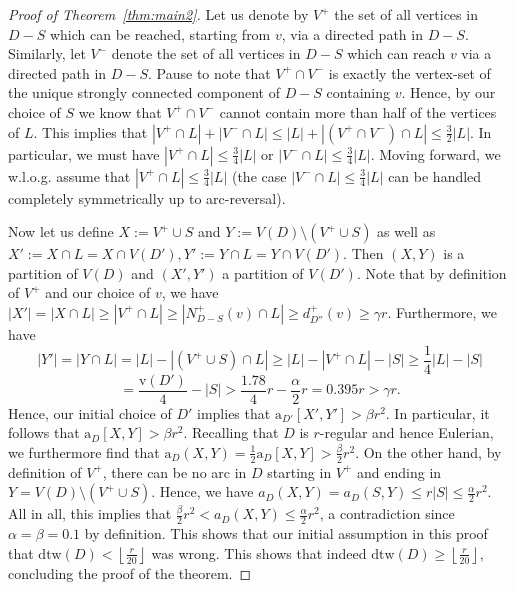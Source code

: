 \documentclass[a4paper,10pt]{article}
\begin{document}
\begin{proof}[Proof of Theorem~\ref{thm:main2}]
Let us denote by $V^+$ the set of all vertices in $D-S$ which can be reached, starting from $v$, via a directed path in $D-S$. Similarly, let $V^-$ denote the set of all vertices in $D-S$ which can reach $v$ via a directed path in $D-S$. Pause to note that $V^+\cap V^-$ is exactly the vertex-set of the unique strongly connected component of $D-S$ containing $v$. Hence, by our choice of $S$ we know that $V^+\cap V^-$ cannot contain more than half of the vertices of $L$. This implies that $|V^+\cap L|+|V^-\cap L|\le |L|+|(V^+\cap V^-)\cap L|\le \frac{3}{2}|L|$. In particular, we must have $|V^+\cap L|\le \frac{3}{4}|L|$ or $|V^-\cap L|\le \frac{3}{4}|L|$. Moving forward, we w.l.o.g. assume that $|V^+\cap L|\le \frac{3}{4}|L|$ (the case $|V^-\cap L|\le \frac{3}{4}|L|$ can be handled completely symmetrically up to arc-reversal).

Now let us define $X:=V^+\cup S$ and $Y:=V(D)\setminus (V^+\cup S)$ as well as $X':=X\cap L=X\cap V(D'), Y':=Y\cap L=Y\cap V(D')$. Then $(X,Y)$ is a partition of $V(D)$ and $(X',Y')$ a partition of $V(D')$. Note that by definition of $V^+$ and our choice of $v$, we have 
$|X'|=|X\cap L|\ge |V^+\cap L|\ge |N_{D-S}^+(v)\cap L|\ge d_{D''}^+(v)\ge \gamma r$. Furthermore, we have $$|Y'|=|Y \cap L|= |L|-|(V^+\cup S)\cap L|\ge |L|-|V^+\cap L|-|S|\ge \frac{1}{4}|L|-|S|$$
$$=\frac{\mathrm{v}(D')}{4}-|S|>\frac{1.78}{4}r-\frac{\alpha}{2}r=0.395 r>\gamma r.$$
Hence, our initial choice of $D'$ implies that $\mathrm{a}_{D'}[X',Y']> \beta r^2$. In particular, it follows that $\mathrm{a}_D[X,Y]> \beta r^2$. Recalling that $D$ is $r$-regular and hence Eulerian, we furthermore find that $\mathrm{a}_D(X,Y)=\frac{1}{2}\mathrm{a}_D[X,Y]> \frac{\beta}{2}r^2$. On the other hand, by definition of $V^+$, there can be no arc in $D$ starting in $V^+$ and ending in $Y=V(D)\setminus (V^+\cup S)$. Hence, we have $a_D(X,Y)=a_D(S,Y)\le r|S|\le \frac{\alpha}{2}r^2$. All in all, this implies that $\frac{\beta}{2}r^2<a_D(X,Y)\le \frac{\alpha}{2}r^2$, a contradiction since $\alpha=\beta=0.1$ by definition. This shows that our initial assumption in this proof that $\mathrm{dtw}(D)<\left\lfloor\frac{r}{20}\right\rfloor$ was wrong. This shows that indeed $\mathrm{dtw}(D)\ge \left\lfloor\frac{r}{20}\right\rfloor$, concluding the proof of the theorem.
\end{proof}
\end{document}
